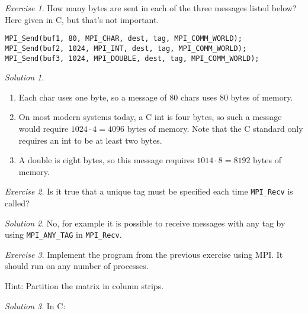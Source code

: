 \documentclass[onecolumn, oneside, a4paper, 11pt]{memoir}
\theoremstyle{remark}
\newtheorem{ex}{Exercise}
\newtheorem*{sol}{Solution}
\begin{document}
\begin{ex}
  How many bytes are sent in each of the three messages listed below? Here given
  in C, but that's not important.

\begin{lstlisting}[style=c]
MPI_Send(buf1, 80, MPI_CHAR, dest, tag, MPI_COMM_WORLD);
MPI_Send(buf2, 1024, MPI_INT, dest, tag, MPI_COMM_WORLD);
MPI_Send(buf3, 1024, MPI_DOUBLE, dest, tag, MPI_COMM_WORLD);
\end{lstlisting}
\end{ex}
\begin{sol} ~
  \begin{enumerate}
  \item Each char uses one byte, so a message of 80 chars uses 80 bytes of
    memory.
  \item On most modern systems today, a C int is four bytes, so such a message
    would require $1024 \cdot 4 = 4096$ bytes of memory. Note that the C
    standard only requires an int to be at least two bytes.
  \item A double is eight bytes, so this message requires $1014 \cdot 8 = 8192$
    bytes of memory.
  \end{enumerate}
\end{sol}

\begin{ex}
  Is it true that a unique tag must be specified each time \texttt{MPI\_Recv} is
  called?
\end{ex}
\begin{sol}
  No, for example it is possible to receive messages with any tag by using
  \texttt{MPI\_ANY\_TAG} in \texttt{MPI\_Recv}.
\end{sol}

\begin{ex}
  Implement the program from the previous exercise using MPI. It should run on
  any number of processes.

  Hint: Partition the matrix in column strips.
\end{ex}
\begin{sol}In C:
  
\end{sol}
\end{document}
